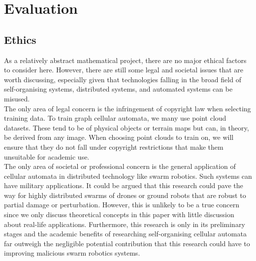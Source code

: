 \chapter{Evaluation}

\section{Ethics}

As a relatively abstract mathematical project, there are no major ethical factors to consider here. However, there are still some legal and societal issues that are worth discussing, especially given that technologies falling in the broad field of self-organising systems, distributed systems, and automated systems can be misused.\\

The only area of legal concern is the infringement of copyright law when selecting training data. To train graph cellular automata, we many use point cloud datasets. These tend to be of physical objects or terrain maps but can, in theory, be derived from any image. When choosing point clouds to train on, we will ensure that they do not fall under copyright restrictions that make them unsuitable for academic use.\\

The only area of societal or professional concern is the general application of cellular automata in distributed technology like swarm robotics. Such systems can have military applications. It could be argued that this research could pave the way for highly distributed swarms of drones or ground robots that are robust to partial damage or perturbation. However, this is unlikely to be a true concern since we only discuss theoretical concepts in this paper with little discussion about real-life applications. Furthermore, this research is only in its preliminary stages and the academic benefits of researching self-organising cellular automata far outweigh the negligible potential contribution that this research could have to improving malicious swarm robotics systems.\\
